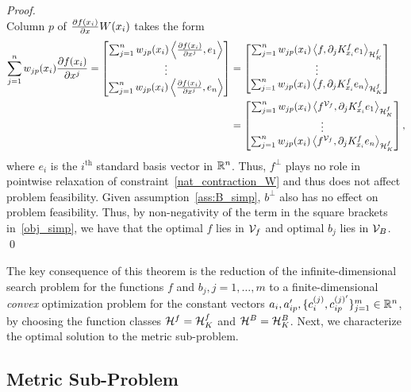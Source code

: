 \begin{proof}
\[\]
Column $p$ of $\frac{\partial f(x_i)}{\partial x} W(x_i)$ takes the form
\[
	\begin{split}
	\sum_{j=1}^{n} w_{j p} (x_i) \dfrac{\partial f(x_i)}{\partial x^j}  = \begin{bmatrix} \sum_{j=1}^{n}  w_{jp}(x_i) \left\langle  \frac{\partial f(x_i)}{\partial x^j} ,  e_1 \right\rangle \\ \vdots \\ 	\sum_{j=1}^{n}  w_{jp}(x_i) \left\langle  \frac{\partial f(x_i)}{\partial x^j} ,  e_n \right\rangle	\end{bmatrix} & = 
												       	 \begin{bmatrix} \sum_{j=1}^{n}  w_{jp}(x_i) \left\langle  f , \partial_j K^f_{x_i} e_1 \right\rangle_{\mathcal{H}_{K}^f} \\ \vdots \\ 	\sum_{j=1}^{n}  w_{jp}(x_i) \left\langle  f , \partial_j K^f_{x_i} e_n \right\rangle_{\mathcal{H}_{K}^f}	\end{bmatrix} \\
					&=  \begin{bmatrix} \sum_{j=1}^{n}  w_{jp}(x_i) \left\langle  f^{\mathcal{V}_{f}} , \partial_j K^f_{x_i} e_1 \right\rangle_{\mathcal{H}_{K}^f} \\ \vdots \\ 	\sum_{j=1}^{n}  w_{jp}(x_i) \left\langle  f^{\mathcal{V}_{f}} , \partial_j K^f_{x_i} e_n \right\rangle_{\mathcal{H}_{K}^f}	\end{bmatrix},
	\end{split}												       	 
\]
where $e_i$ is the $i^{\text{th}}$ standard basis vector in $\mathbb{R}^n$. Thus, $f^\perp$ plays no role in pointwise relaxation of constraint~\eqref{nat_contraction_W} and thus does not affect problem feasibility.
Given assumption~\ref{ass:B_simp}, $b^{\perp}$ also has no effect on problem feasibility. Thus, by non-negativity of the term in the square brackets in~\eqref{obj_simp}, we have that the optimal $f$ lies in $\mathcal{V}_{f}$ and optimal $b_j$ lies in $\mathcal{V}_{B}$. \qed
\end{proof}

The key consequence of this theorem is the reduction of the infinite-dimensional search problem for the functions $f$ and $b_j, j=1,\ldots,m$ to a finite-dimensional \emph{convex} optimization problem for the constant vectors $a_i,a'_{ip},\{c_i^{(j)}, c_{ip}^{(j)'}\}_{j=1}^{m} \in \mathbb{R}^n$, by choosing the function classes $\mathcal{H}^f = \mathcal{H}_{K}^{f}$ and $\mathcal{H}^B = \mathcal{H}_{K}^{B}$. Next, we characterize the optimal solution to the metric sub-problem.

\subsection{Metric Sub-Problem}\label{sec:met_sub}

